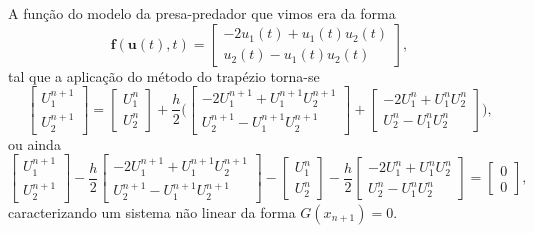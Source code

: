 \documentclass[../differential_methods.tex]{subfiles}
\begin{document}
\begin{example}
	A função do modelo da presa-predador que vimos era da forma
	\[
		\mathbf{f}(\mathbf{u}(t), t)= \begin{bmatrix}
			-2u_1(t)+u_1(t)u_2(t) \\
			u_2(t)-u_1(t)u_2(t)
		\end{bmatrix},
	\]
	tal que a aplicação do método do trapézio torna-se
	\[
		\begin{bmatrix}
			U_{1}^{n+1} \\
			U_{2}^{n+1}
		\end{bmatrix}=\begin{bmatrix}
			U_{1}^{n} \\
			U_{2}^{n}
		\end{bmatrix} + \frac{h}{2}\biggl(\begin{bmatrix}
				-2U_{1}^{n+1} + U_{1}^{n+1}U_{2}^{n+1} \\
				U_{2}^{n+1} - U_{1}^{n+1}U_{2}^{n+1}
			\end{bmatrix} + \begin{bmatrix}
				-2U_{1}^{n} + U_{1}^{n}U_{2}^{n} \\
				U_{2}^{n} - U_{1}^{n}U_{2}^{n}
			\end{bmatrix}\biggr),
	\]
	ou ainda
	\[
		\begin{bmatrix}
			U_{1}^{n+1} \\
			U_{2}^{n+1}
		\end{bmatrix}
		- \frac{h}{2}\begin{bmatrix}
			-2U_{1}^{n+1} + U_{1}^{n+1}U_{2}^{n+1} \\
			U_{2}^{n+1} - U_{1}^{n+1}U_{2}^{n+1}
		\end{bmatrix} - \begin{bmatrix}
			U_{1}^{n} \\
			U_{2}^{n}
		\end{bmatrix}
		- \frac{h}{2} \begin{bmatrix}
			-2U_{1}^{n} + U_{1}^{n}U_{2}^{n} \\
			U_{2}^{n} - U_{1}^{n}U_{2}^{n}
		\end{bmatrix}= \begin{bmatrix}
			0 \\
			0
		\end{bmatrix},
	\]
	caracterizando um sistema não linear da forma \(G(x_{n+1})=0.\)


\end{example}
\end{document}
